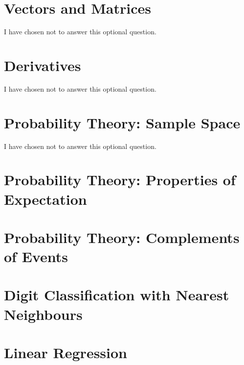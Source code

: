 \documentclass[12pt]{article}
\begin{document}
\section{Vectors and Matrices}

I have chosen not to answer this optional question.

\section{Derivatives}

I have chosen not to answer this optional question.

\section{Probability Theory: Sample Space}

I have chosen not to answer this optional question.

\section{Probability Theory: Properties of Expectation}



\section{Probability Theory: Complements of Events}



\section{Digit Classification with Nearest Neighbours}



\section{Linear Regression}


\end{document}
